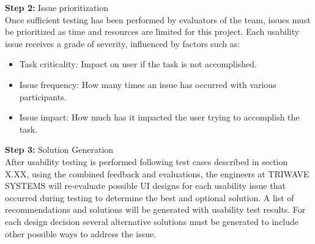 \textbf{Step 2:} Issue prioritization\\
\medskip
Once sufficient testing has been performed by evaluators of the team, issues must be prioritized as time and resources are limited for this project. Each usability issue receives a grade of severity, influenced by factors such as:
\begin{itemize}
\setlength\itemsep{0.1mm}
	\item Task criticality: Impact on user if the task is not accomplished.
	\item Issue frequency: How many times an issue has occurred with various participants.
	\item Issue impact: How much has it impacted the user trying to accomplish the task.
\end{itemize}

\bigskip



\textbf{Step 3:} Solution Generation\\
\medskip
After usability testing is performed following test cases described in section X.XX, using the combined feedback and evaluations, the engineers at TRIWAVE SYSTEMS will re-evaluate possible UI designs for each usability issue that occurred during testing to determine the best and optional solution. A list of recommendations and solutions will be generated with usability test results. For each design decision several alternative solutions must be generated to include other possible ways to address the issue. 